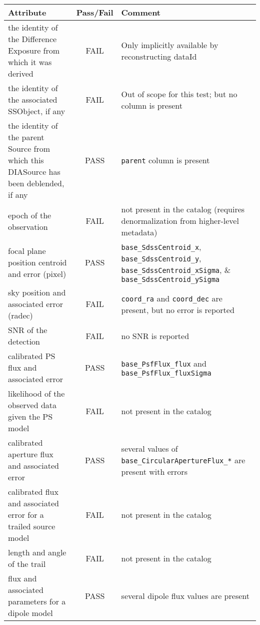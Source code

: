 \documentclass[DM,STR,toc]{lsstdoc}
\begin{document}
\begin{table}[h]
    \begin{tabular}{|p{}|c|p{}|}
        \hline
        Attribute & Pass/Fail & Comment \\
        \hline\hline
        the identity of the Difference Exposure from which it was derived & FAIL & Only implicitly available by reconstructing dataId \\
        \hline
        the identity of the associated SSObject, if any & FAIL & Out of scope for this test; but no column is present \\
        \hline
        the identity of the parent Source from which this DIASource has been deblended, if any & PASS & \texttt{parent} column is present \\
        \hline
        epoch of the observation & FAIL & not present in the catalog (requires denormalization from higher-level metadata) \\
        \hline
        focal plane position centroid and error (pixel) & PASS &
        \texttt{base\_SdssCentroid\_x},
        \texttt{base\_SdssCentroid\_y},
        \texttt{base\_SdssCentroid\_xSigma}, \&
        \texttt{base\_SdssCentroid\_ySigma} \\
        \hline
        sky position and associated error (radec) & FAIL & \texttt{coord\_ra} and \texttt{coord\_dec} are present, but no error is reported \\
        \hline
        SNR of the detection & FAIL & no SNR is reported \\
        \hline
        calibrated PS flux and associated error & PASS & \texttt{base\_PsfFlux\_flux} and \texttt{base\_PsfFlux\_fluxSigma} \\
        \hline
        likelihood of the observed data given the PS model & FAIL & not present in the catalog \\
        \hline
        calibrated aperture flux and associated error & PASS & several values of \texttt{base\_CircularApertureFlux\_*} are present with errors \\
        \hline
        calibrated flux and associated error for a trailed source model & FAIL & not present in the catalog \\
        \hline
        length and angle of the trail & FAIL & not present in the catalog \\
        \hline
        flux and associated parameters for a dipole model & PASS & several dipole flux values are present \\

\end{tabular}
\end{table}
\end{document}
